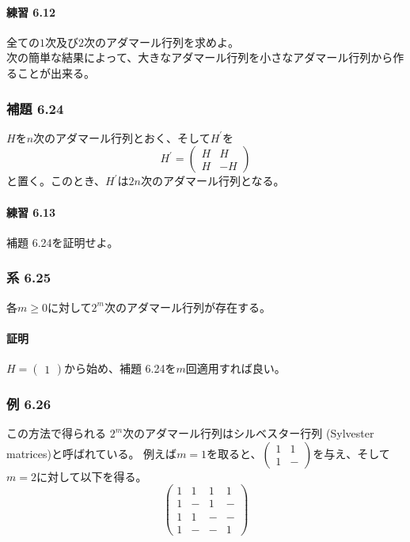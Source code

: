 \documentclass[12pt,a4paper]{article}
\begin{document}
      \paragraph{練習 6.12}
        全ての$1$次及び$2$次のアダマール行列を求めよ。 \\

    次の簡単な結果によって、大きなアダマール行列を小さなアダマール行列から作ることが出来る。

    \subsubsection*{補題 6.24}
      $H$を$n$次のアダマール行列とおく、そして$H^\prime$を
      \[H^\prime = \begin{pmatrix} H & H \\ H & -H\end{pmatrix}\]
      と置く。このとき、$H^\prime$は$2n$次のアダマール行列となる。

      \paragraph{練習 6.13}
        補題 6.24を証明せよ。

    \subsubsection*{系 6.25}
      各$m \geq 0$に対して$2^m$次のアダマール行列が存在する。
      
      \paragraph{証明}
        $H = \begin{pmatrix}  1\end{pmatrix}$から始め、補題 6.24を$m$回適用すれば良い。

    \subsubsection*{例 6.26}
      この方法で得られる $2^m$次のアダマール行列はシルベスター行列 (Sylvester matrices)と呼ばれている。
      例えば$m = 1$を取ると、$\begin{pmatrix} 1 & 1 \\ 1 & - \end{pmatrix}$を与え、そして$m = 2$に対して以下を得る。
      \[ \begin{pmatrix}
          1 & 1 & 1 & 1 \\
          1 & - & 1 & - \\
          1 & 1 & - & - \\
          1 & - & - & 1
      \end{pmatrix} \]
\end{document}
